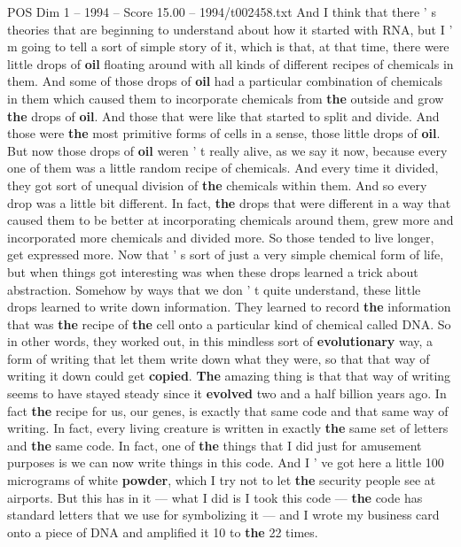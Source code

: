 \begin{textsample}{POS Dim 1 – 1994 – Score 15.00 – 1994/t002458.txt}
And I think that there ' s theories that are beginning to understand about how it started with RNA, but I ' m going to tell a sort of simple story of it, which is that, at that time, there were little drops of \textbf{oil} floating around with all kinds of different recipes of chemicals in them.
And some of those drops of \textbf{oil} had a particular combination of chemicals in them which caused them to incorporate chemicals from \textbf{the} outside and grow \textbf{the} drops of \textbf{oil}.
And those that were like that started to split and divide.
And those were \textbf{the} most primitive forms of cells in a sense, those little drops of \textbf{oil}.
But now those drops of \textbf{oil} weren ' t really alive, as we say it now, because every one of them was a little random recipe of chemicals.
And every time it divided, they got sort of unequal division of \textbf{the} chemicals within them.
And so every drop was a little bit different.
In fact, \textbf{the} drops that were different in a way that caused them to be better at incorporating chemicals around them, grew more and incorporated more chemicals and divided more.
So those tended to live longer, get expressed more.
Now that ' s sort of just a very simple chemical form of life, but when things got interesting was when these drops learned a trick about abstraction.
Somehow by ways that we don ' t quite understand, these little drops learned to write down information.
They learned to record \textbf{the} information that was \textbf{the} recipe of \textbf{the} cell onto a particular kind of chemical called DNA.
So in other words, they worked out, in this mindless sort of \textbf{evolutionary} way, a form of writing that let them write down what they were, so that that way of writing it down could get \textbf{copied}. \textbf{The} amazing thing is that that way of writing seems to have stayed steady since it \textbf{evolved} two and a half billion years ago.
In fact \textbf{the} recipe for us, our genes, is exactly that same code and that same way of writing.
In fact, every living creature is written in exactly \textbf{the} same set of letters and \textbf{the} same code.
In fact, one of \textbf{the} things that I did just for amusement purposes is we can now write things in this code.
And I ' ve got here a little 100 micrograms of white \textbf{powder}, which I try not to let \textbf{the} security people see at airports.
But this has in it — what I did is I took this code — \textbf{the} code has standard letters that we use for symbolizing it — and I wrote my business card onto a piece of DNA and amplified it 10 to \textbf{the} 22 times.

\end{textsample}
